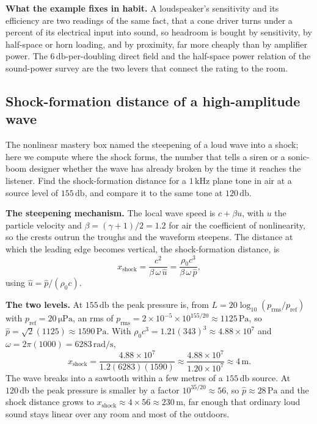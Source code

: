 \textbf{What the example fixes in habit.} A loudspeaker's sensitivity and
its efficiency are two readings of the same fact, that a cone driver turns
under a percent of its electrical input into sound, so headroom is bought
by sensitivity, by half-space or horn loading, and by proximity, far more
cheaply than by amplifier power. The $6\,\si{\decibel}$-per-doubling direct
field and the half-space power relation of the sound-power survey are the
two levers that connect the rating to the room.

\subsection{Shock-formation distance of a high-amplitude wave}

The nonlinear mastery box named the steepening of a loud wave into a shock;
here we compute where the shock forms, the number that tells a siren or a
sonic-boom designer whether the wave has already broken by the time it
reaches the listener. Find the shock-formation distance for a
$1\,\si{\kilo\hertz}$ plane tone in air at a source level of
$155\,\si{\decibel}$, and compare it to the same tone at
$120\,\si{\decibel}$.

\textbf{The steepening mechanism.} The local wave speed is $c + \beta u$,
with $u$ the particle velocity and $\beta = (\gamma+1)/2 = 1.2$ for air the
coefficient of nonlinearity, so the crests outrun the troughs and the
waveform steepens. The distance at which the leading edge becomes vertical,
the shock-formation distance, is
\[
x_{\text{shock}} = \frac{c^2}{\beta\,\omega\,\hat u}
                 = \frac{\rho_0 c^3}{\beta\,\omega\,\hat p},
\]
using $\hat u = \hat p/(\rho_0 c)$.

\textbf{The two levels.} At $155\,\si{\decibel}$ the peak pressure is, from
$L = 20\log_{10}(p_{\text{rms}}/p_{\text{ref}})$ with $p_{\text{ref}} =
20\,\si{\micro\pascal}$, an rms of $p_{\text{rms}} = 2\times 10^{-5}\times
10^{155/20}\approx 1125\,\si{\pascal}$, so $\hat p = \sqrt2(1125)\approx
1590\,\si{\pascal}$. With $\rho_0 c^3 = 1.21(343)^3\approx 4.88\times
10^{7}$ and $\omega = 2\pi(1000) = 6283\,\si{\radian\per\second}$,
\[
x_{\text{shock}} = \frac{4.88\times 10^{7}}{1.2(6283)(1590)}
                 \approx \frac{4.88\times 10^{7}}{1.20\times 10^{7}}
                 \approx 4\,\si{\meter}.
\]
The wave breaks into a sawtooth within a few metres of a
$155\,\si{\decibel}$ source. At $120\,\si{\decibel}$ the peak pressure is
smaller by a factor $10^{35/20}\approx 56$, so $\hat p\approx
28\,\si{\pascal}$ and the shock distance grows to
$x_{\text{shock}}\approx 4\times 56 \approx 230\,\si{\meter}$, far enough
that ordinary loud sound stays linear over any room and most of the
outdoors.

